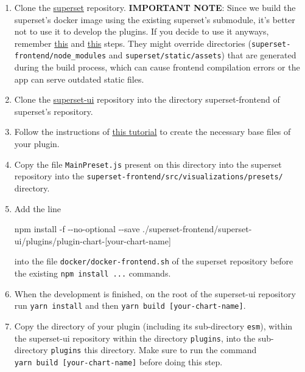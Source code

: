 \documentclass[
]{book}
\newenvironment{Shaded}{\begin{snugshade}}{\end{snugshade}}
\newcommand{\ExtensionTok}[1]{#1}
\newcommand{\NormalTok}[1]{#1}
\begin{document}
\begin{enumerate}
\def\labelenumi{\arabic{enumi}.}
\item
  Clone the \href{https://github.com/apache/superset}{superset} repository.
  \textbf{IMPORTANT NOTE}: Since we build the superset's docker image using the existing superset's submodule, it's better not to use it to develop the plugins.
  If you decide to use it anyways, remember \href{https://github.com/EHDEN/NetworkDashboards/blob/master/docker/superset/Dockerfile\#L54}{this} and \href{https://github.com/EHDEN/NetworkDashboards/blob/master/docker/superset/Dockerfile\#L99}{this} steps.
  They might override directories (\texttt{superset-frontend/node\_modules} and \texttt{superset/static/assets}) that are generated during the build process, which can cause frontend compilation errors or the app can serve outdated static files.
\item
  Clone the \href{https://github.com/apache-superset/superset-ui}{superset-ui} repository into the directory superset-frontend of superset's repository.
\item
  Follow the instructions of \href{https://superset.apache.org/docs/installation/building-custom-viz-plugins}{this tutorial} to create the necessary base files of your plugin.
\item
  Copy the file \texttt{MainPreset.js} present on this directory into the superset repository into the \texttt{superset-frontend/src/visualizations/presets/} directory.
\item
  Add the line

\begin{Shaded}
\begin{Highlighting}[]
\ExtensionTok{npm}\NormalTok{ install}
  \ExtensionTok{{-}f}\NormalTok{ {-}{-}no{-}optional {-}{-}save}
  \ExtensionTok{./superset{-}frontend/superset{-}ui/plugins}\NormalTok{/}\ExtensionTok{plugin{-}chart{-}}\NormalTok{[your{-}chart{-}name]}
\end{Highlighting}
\end{Shaded}

  into the file \texttt{docker/docker-frontend.sh} of the superset repository before the existing \texttt{npm\ install\ ...} commands.
\item
  When the development is finished, on the root of the superset-ui repository run \texttt{yarn\ install} and then \texttt{yarn\ build\ {[}your-chart-name{]}}.
\item
  Copy the directory of your plugin (including its sub-directory \texttt{esm}), within the superset-ui repository within the directory \texttt{plugins}, into the sub-directory \texttt{plugins} this directory.
  Make sure to run the command \texttt{yarn\ build\ {[}your-chart-name{]}} before doing this step.
\end{enumerate}
\end{document}
